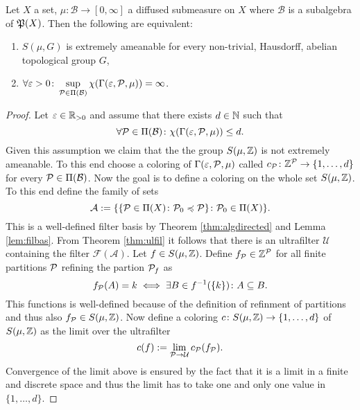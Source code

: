 \begin{thm}\label{thm:colve}
  Let $X$ a set, $\mu\colon \mathcal{B} \to [0, \infty]$ a diffused submeasure on $X$ where $\mathcal{B}$ is a subalgebra of $\PowS(X)$. Then the following are equivalent:
  \begin{enumerate}
    \item $S(\mu, G)$ is extremely ameanable for every non-trivial, Hausdorff, abelian topological group $G$,
    \item $\forall \varepsilon > 0\colon \sup\limits_{\P \in \Pi(\mathcal{B})}\chi(\Gamma(\varepsilon, \mathcal{P}, \mu)) = \infty$.
  \end{enumerate}
\end{thm}

\begin{proof}
  Let $\varepsilon \in \R_{>0}$ and assume that there exists $d \in \N$ such that
  \begin{equation*}
    \forall \P \in \Pi(\mathcal{B})\colon \chi(\Gamma(\varepsilon, {\P}, \mu)) \leq d. 
  \end{equation*}
  Given this assumption we claim that the the group $S(\mu, \Z)$ is not extremely ameanable. To this end choose a coloring of $\Gamma(\varepsilon, \P, \mu)$ called $c_{\P}\colon \Z^{\P} \to \{1, \ldots, d\}$ for every $\P \in \Pi(\mathcal{B})$. Now the goal is to define a coloring on the whole set $S(\mu, \Z)$. To this end define the family of sets
  \begin{equation*}
    \mathcal{A} := \{\{ \P \in \Pi(X)\colon \P_0 \preccurlyeq \P\}\colon \P_0 \in \Pi(X)\}.
  \end{equation*}
  This is a well-defined filter basis by Theorem \ref{thm:algdirected} and Lemma \ref{lem:filbas}. From Theorem \ref{thm:ulfil} it follows that there is an ultrafilter $\mathcal{U}$ containing the filter $\mathcal{F}(\mathcal{A})$.
 Let $f \in S(\mu, \Z)$. Define $f_\P \in \Z^\P$ for all finite partitions $\P$ refining the partion $\P_f$ as
  \begin{equation*}
    f_\P(A) = k \iff \exists B \in f^{-1}(\{k\})\colon A \subseteq B. 
  \end{equation*}
  This functions is well-defined because of the definition of refinment of partitions and thus also $f_\P \in S(\mu, \Z)$.
  Now define a coloring $c\colon S(\mu, \Z) \to \{1, \ldots, d\}$ of $S(\mu, \Z)$ as the limit over the ultrafilter
  \begin{equation*}
    c(f) := \lim\limits_{\P \to \mathcal{U}} c_{\P}(f_\P).
  \end{equation*}
  Convergence of the limit above is ensured by the fact that it is a limit in a finite and discrete space and thus the limit has to take one and only one value in $\{1, \ldots, d\}$.
  

\end{proof}
